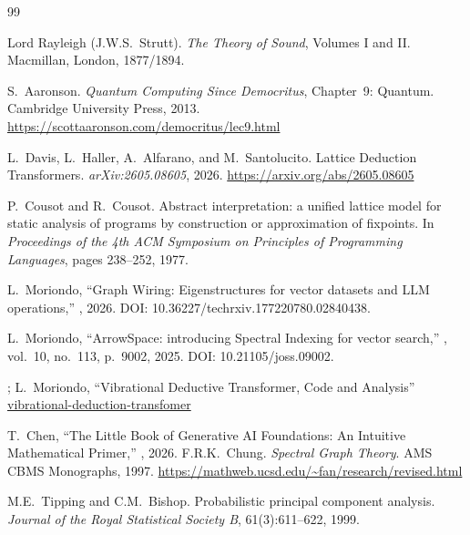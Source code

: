 \documentclass[11pt,a4paper]{article}
\begin{document}

\begin{thebibliography}{99}

Lord Rayleigh (J.W.S.\ Strutt).
\newblock \emph{The Theory of Sound}, Volumes I and II.
\newblock Macmillan, London, 1877/1894.

S.\ Aaronson.
\newblock \emph{Quantum Computing Since Democritus}, Chapter~9: Quantum.
\newblock Cambridge University Press, 2013.
\newblock \url{https://scottaaronson.com/democritus/lec9.html}

L.~Davis, L.~Haller, A.~Alfarano, and M.~Santolucito.
\newblock Lattice Deduction Transformers.
\newblock \emph{arXiv:2605.08605}, 2026.
\newblock \url{https://arxiv.org/abs/2605.08605}

P.~Cousot and R.~Cousot.
\newblock Abstract interpretation: a unified lattice model for static analysis of programs by construction or approximation of fixpoints.
\newblock In \emph{Proceedings of the 4th ACM Symposium on Principles of Programming Languages}, pages 238--252, 1977.

L.~Moriondo, 
\newblock ``Graph Wiring: Eigenstructures for vector datasets and LLM operations,'' 
, 2026.
\newblock DOI: 10.36227/techrxiv.177220780.02840438.

L.~Moriondo, 
\newblock ``ArrowSpace: introducing Spectral Indexing for vector search,'' 
, vol.~10, no.~113, p.~9002, 2025.
\newblock DOI: 10.21105/joss.09002.

;
L.~Moriondo, 
\newblock ``Vibrational Deductive Transformer, Code and Analysis'' 
\href{https://github.com/tuned-org-uk/vibrational-deduction-transfomer}{%
    vibrational-deduction-transfomer}


T.~Chen,
\newblock ``The Little Book of Generative AI Foundations: An Intuitive Mathematical Primer,''
, 2026.
F.R.K.\ Chung.
\newblock \emph{Spectral Graph Theory}.
\newblock AMS CBMS Monographs, 1997.
\newblock \url{https://mathweb.ucsd.edu/~fan/research/revised.html}

M.E.\ Tipping and C.M.\ Bishop.
\newblock Probabilistic principal component analysis.
\newblock \emph{Journal of the Royal Statistical Society B}, 61(3):611--622, 1999.


\end{thebibliography}
\end{document}
